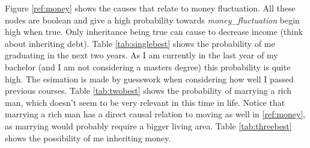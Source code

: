 \documentclass[12pt]{article} %
\begin{document}
\FloatBarrier
Figure \ref{ref:money} shows the causes that relate to money fluctuation. All
these nodes are boolean and give a high probability towards
\emph{money\_fluctuation} begin high when true. Only inheritance being true can
cause to decrease income (think about inheriting debt). Table
\ref{tab:singlebest} shows the probability of me graduating in the next two
years. As I am currently in the last year of my bachelor (and I am not
considering a masters degree) this probability is quite high. The esimation is
made by guesswork when considering how well I passed previous courses. Table
\ref{tab:twobest} shows the probability of marrying a rich man, which doesn't
seem to be very relevant in this time in life. Notice that marrying a rich man
has a direct causal relation to moving as well in \ref{ref:money}, as marrying would
probably require a bigger living area.
Table \ref{tab:threebest} shows the
possibility of me inheriting money.

\begin{table} 
    \centering
\end{table}
\end{document}
